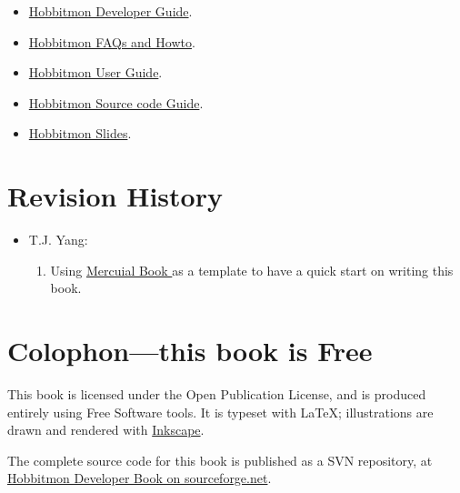 \begin{itemize}
\item
  \href{http://hobbitmon.svn.sourceforge.net/viewvc/hobbitmon/branches/tjyang/src/books/hobbitmon-developer/en/}{Hobbitmon
    Developer Guide}.
\item
  \href{http://hobbitmon.svn.sourceforge.net/viewvc/hobbitmon/branches/tjyang/src/books/hobbitmon-faq-howto/en/}{Hobbitmon
    FAQs and Howto}.
\item
  \href{http://hobbitmon.svn.sourceforge.net/viewvc/hobbitmon/branches/tjyang/src/books/hobbitmon-user-guide/en/}{Hobbitmon
    User Guide}.
\item
  \href{http://hobbitmon.svn.sourceforge.net/viewvc/hobbitmon/branches/tjyang/src/books/hobbitmon-sourcecode-guide/en/}{Hobbitmon
Source code Guide}.
\item
  \href{http://hobbitmon.svn.sourceforge.net/viewvc/hobbitmon/branches/tjyang/src/hobbitmon-slides/en/}{Hobbitmon
    Slides}.

\end{itemize}

\section{Revision History}

\begin{itemize}
\item T.J. Yang:
 \begin{enumerate}
  \item Using \href{http://hg.serpentine.com/mercurial/book/}{Mercuial Book } as a template to have a quick start on
    writing this book.
 \end{enumerate}

\end{itemize}

\section{Colophon---this book is Free}

This book is licensed under the Open Publication License, and is
produced entirely using Free Software tools.  It is typeset with
\LaTeX{}; illustrations are drawn and rendered with
\href{http://www.inkscape.org/}{Inkscape}.

The complete source code for this book is published as a SVN
repository, at
\href{http://hobbitmon.svn.sourceforge.net/viewvc/hobbitmon/branches/tjyang/src/books/hobbitmon-developer/en/}{Hobbitmon
  Developer Book on sourceforge.net}.


